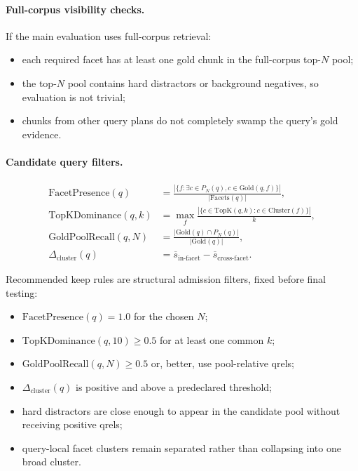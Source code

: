 \documentclass[11pt,a4paper]{article}
\begin{document}
\paragraph{Full-corpus visibility checks.}
If the main evaluation uses full-corpus retrieval:

\begin{itemize}[leftmargin=*]
	\item each required facet has at least one gold chunk in the full-corpus top-$N$ pool;
	\item the top-$N$ pool contains hard distractors or background negatives, so evaluation is not trivial;
	\item chunks from other query plans do not completely swamp the query's gold evidence.
\end{itemize}

\paragraph{Candidate query filters.}

\begin{align}
	\text{FacetPresence}(q)    & = \frac{|\{f: \exists c \in P_N(q), c \in \text{Gold}(q,f)\}|}{|\text{Facets}(q)|}, \\
	\text{TopKDominance}(q,k)  & = \max_f \frac{|\{c \in \text{TopK}(q,k): c \in \text{Cluster}(f)\}|}{k},           \\
	\text{GoldPoolRecall}(q,N) & = \frac{|\text{Gold}(q) \cap P_N(q)|}{|\text{Gold}(q)|},                            \\
	\Delta_{\text{cluster}}(q) & = \overline{s}_{\text{in-facet}} - \overline{s}_{\text{cross-facet}}.
\end{align}

Recommended keep rules are structural admission filters, fixed before final testing:

\begin{itemize}[leftmargin=*]
	\item $\text{FacetPresence}(q)=1.0$ for the chosen $N$;
	\item $\text{TopKDominance}(q,10) \geq 0.5$ for at least one common $k$;
	\item $\text{GoldPoolRecall}(q,N) \geq 0.5$ or, better, use pool-relative qrels;
	\item $\Delta_{\text{cluster}}(q)$ is positive and above a predeclared threshold;
	\item hard distractors are close enough to appear in the candidate pool without receiving positive qrels;
	\item query-local facet clusters remain separated rather than collapsing into one broad cluster.
\end{itemize}
\end{document}
